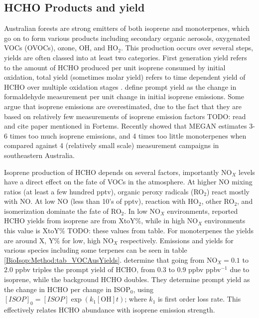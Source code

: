   \subsection{HCHO Products and yield}
    \label{BioIsop:Method:HCHOYield}
    Australian forests are strong emitters of both isoprene and monoterpenes, which go on to form various products including secondary organic aerosols, oxygenated VOCs (OVOCs), ozone, OH, and HO$_2$.
    This production occurs over several steps, yields are often classed into at least two categories.
    First generation yield refers to the amount of HCHO produced per unit isoprene consumed by initial oxidation, total yield (sometimes molar yield) refers to time dependent yield of HCHO over multiple oxidation stages \parencite{Wolfe2016}.
    \textcite{Wolfe2016} define prompt yield as the change in formaldehyde measurement per unit change in initial isoprene emissions.
    Some argue that isoprene emissions are overestimated, due to the fact that they are based on relatively few measurements of isoprene emission factors \parencite{Winters2009, FortemsCheiney2012} TODO: read and cite paper mentioned in Fortems.
    Recently \textcite{Emmerson2017} showed that MEGAN estimates 3-6 times too much isoprene emissions, and 4 times too little monoterpenes when compared against 4 (relatively small scale) measurement campaigns in southeastern Australia.
    
    Isoprene production of HCHO depends on several factors, importantly NO$_X$ levels have a direct effect on the fate of VOCs in the atmosphere.
    At higher NO mixing ratios (at least a few hundred pptv), organic peroxy radicals (RO$_2$) react mostly with NO. 
    At low NO (less than 10's of pptv), reaction with HO$_2$, other RO$_2$, and isomerization dominate the fate of RO$_2$.
    In low NO$_X$ environments, reported HCHO yields from isoprene are from XtoY\%, while in high NO$_X$ environments this value is XtoY\% TODO: these values from table.
    For monoterpenes the yields are around X, Y\% for low, high NO$_X$ respectively.
    Emissions and yields for various species including some terpenes can be seen in table \ref{BioIsop:Method:tab_VOCAusYields}.
    \textcite{Wolfe2016} determine that going from NO$_X = 0.1$ to $2.0$ ppbv triples the prompt yield of HCHO, from 0.3 to 0.9 ppbv ppbv$^{-1}$ due to isoprene, while the background HCHO doubles.
    They determine prompt yield as the change in HCHO per change in ISOP$_0$, using $[ISOP]_0=[ISOP]\exp(k_1[\mathrm{OH}]t)$; where $k_1$ is first order loss rate.
    This effectively relates HCHO abundance with isoprene emission strength.
    
